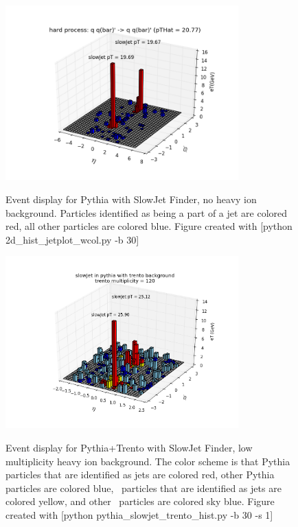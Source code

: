 \documentclass[11pt]{article}
\begin{document}
\begin{figure}[h]
\begin{center}
\includegraphics[width=0.8\textwidth]{2d_hist_jetplot_wcol.png}
\label{fig_label}
\caption{Event display for Pythia with SlowJet Finder, no heavy ion background.  Particles identified as being a part of a jet are colored red, all other particles are colored blue. Figure created with [python 2d\_hist\_jetplot\_wcol.py -b 30]}
\end{center}
\end{figure}

\begin{figure}[h]
\begin{center}
\includegraphics[width=0.8\textwidth]{pythia_slowjet_trento_hist1.png}
\label{fig_label}
\caption{Event display for Pythia+Trento with SlowJet Finder, low multiplicity heavy ion background. The color scheme is that Pythia particles that are identified as jets are colored red, other Pythia particles are colored blue, \trento\ particles that are identified as jets are colored yellow, and other \trento\ particles are colored sky blue. Figure created with [python pythia\_slowjet\_trento\_hist.py -b 30 -s 1]}
\end{center}
\end{figure}
\end{document}
